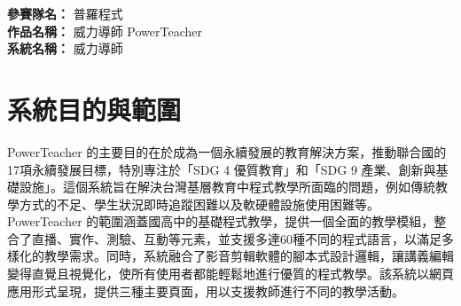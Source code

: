\documentclass[12pt]{article}
\begin{document}
\date{}
\usetikzlibrary{automata, positioning, arrows}
{}
\renewcommand{\arraystretch}{1.45}

\noindent
\textbf{參賽隊名：} 普羅程式 \\
\textbf{作品名稱：} 威力導師 PowerTeacher \\
\textbf{系統名稱：} 威力導師

\section{系統目的與範圍}

PowerTeacher 的主要目的在於成為一個永續發展的教育解決方案，推動聯合國的17項永續發展目標，特別專注於「SDG 4 優質教育」和「SDG 9 產業、創新與基礎設施」。這個系統旨在解決台灣基層教育中程式教學所面臨的問題，例如傳統教學方式的不足、學生狀況即時追蹤困難以及軟硬體設施使用困難等。PowerTeacher 的範圍涵蓋國高中的基礎程式教學，提供一個全面的教學模組，整合了直播、實作、測驗、互動等元素，並支援多達60種不同的程式語言，以滿足多樣化的教學需求。同時，系統融合了影音剪輯軟體的腳本式設計邏輯，讓講義編輯變得直覺且視覺化，使所有使用者都能輕鬆地進行優質的程式教學。該系統以網頁應用形式呈現，提供三種主要頁面，用以支援教師進行不同的教學活動。
\end{document}
